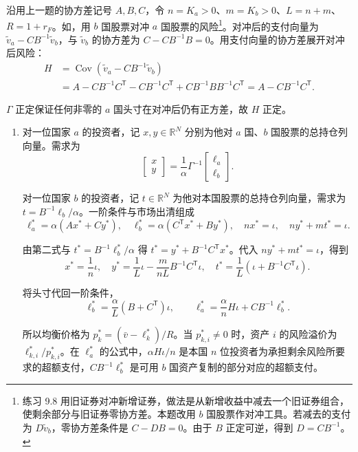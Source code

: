 \begin{solution}[blank-type=manual,blank-vsep=9\baselineskip]
沿用上一题的协方差记号 $A,B,C$，令 $n=K_a>0$、$m=K_b>0$、$L=n+m$、$R=1+r_F$。如，用 $b$ 国股票对冲 $a$ 国股票的风险\footnote{练习 9.8 用旧证券对冲新增证券，做法是从新增收益中减去一个旧证券组合，使剩余部分与旧证券零协方差。本题改用 $b$ 国股票作对冲工具。若减去的支付为 $D\widetilde v_b$，零协方差条件是 $C-DB=0$。由于 $B$ 正定可逆，得到 $D=CB^{-1}$。}。对冲后的支付向量为 $\widetilde v_a-CB^{-1}\widetilde v_b$，与 $\widetilde v_b$ 的协方差为 $C-CB^{-1}B=0$。用支付向量的协方差展开对冲后风险：
\[
 \begin{aligned}
 H&=\operatorname{Cov}(\widetilde v_a-CB^{-1}\widetilde v_b)\\
 &=A-CB^{-1}C^{\mathsf T}-CB^{-1}C^{\mathsf T}
   +CB^{-1}BB^{-1}C^{\mathsf T}
 =A-CB^{-1}C^{\mathsf T}.
 \end{aligned}
\]

$\Gamma$ 正定保证任何非零的 $a$ 国头寸在对冲后仍有正方差，故 $H$ 正定。
\begin{enumerate}[label=(\alph*)]
\item 对一位国家 $a$ 的投资者，记 $x,y\in\mathbb R^N$ 分别为他对 $a$ 国、$b$ 国股票的总持仓列向量。需求为
\[
 \begin{bmatrix}x\\y\end{bmatrix}
 =\frac1\alpha\Gamma^{-1}\begin{bmatrix}\ell_a\\\ell_b\end{bmatrix}.
\]

对一位国家 $b$ 的投资者，记 $t\in\mathbb R^N$ 为他对本国股票的总持仓列向量，需求为 $t=B^{-1}\ell_b/\alpha$。一阶条件与市场出清组成
\[
 \ell_a^*=\alpha(Ax^*+Cy^*),\quad
 \ell_b^*=\alpha(C^{\mathsf T}x^*+By^*),\quad
 nx^*=\iota,\quad ny^*+mt^*=\iota.
\]

由第二式与 $t^*=B^{-1}\ell_b^*/\alpha$ 得 $t^*=y^*+B^{-1}C^{\mathsf T}x^*$。代入 $ny^*+mt^*=\iota$，得到
\[
 \boxed{x^*=\frac1n\iota,\quad
 y^*=\frac1L\iota-\frac{m}{nL}B^{-1}C^{\mathsf T}\iota,\quad
 t^*=\frac1L(\iota+B^{-1}C^{\mathsf T}\iota)}.
\]

将头寸代回一阶条件，
\[
 \boxed{\ell_b^*=\frac\alpha L(B+C^{\mathsf T})\iota,\qquad
 \ell_a^*=\frac\alpha nH\iota+CB^{-1}\ell_b^*}.
\]

所以均衡价格为 $p_k^*=(\bar v-\ell_k^*)/R$。当 $p_{k,i}^*\ne0$ 时，资产 $i$ 的风险溢价为 $\ell_{k,i}^*/p_{k,i}^*$。在 $\ell_a^*$ 的公式中，$\alpha H\iota/n$ 是本国 $n$ 位投资者为承担剩余风险所要求的超额支付，$CB^{-1}\ell_b^*$ 是可用 $b$ 国资产复制的部分对应的超额支付。


\end{enumerate}
\end{solution}
